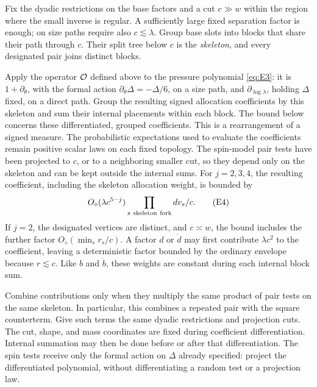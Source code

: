 \begin{proposition}\label{exp:prop-low-coefficients}
Fix the dyadic restrictions on the base factors and a cut \(c\gg w\)
within the region where the small inverse is regular. A sufficiently
large fixed separation factor is enough; on size paths require also
\(c\lesssim\lambda\). Group base slots into blocks that share their
path through \(c\). Their split tree below \(c\) is the \emph{skeleton},
and every designated pair joins distinct blocks.

Apply the operator \({\cal O}\) defined above to the pressure
polynomial \eqref{eq:E3}: it is \(1+\partial_\theta\), with the
formal action \(\partial_\theta\Delta=-\Delta/6\), on a size path,
and \(\partial_{\log\lambda}\), holding \(\Delta\) fixed, on a
direct path. Group the resulting signed allocation coefficients by
this skeleton and sum their internal placements within each block.
The bound below concerns these differentiated, grouped coefficients.
This is a rearrangement of a signed measure. The probabilistic
expectations used to evaluate
the coefficients remain positive scalar laws on each fixed topology.
The spin-model pair tests have been projected to \(c\), or to a
neighboring smaller cut, so they depend only on the skeleton and can
be kept outside the internal sums. For \(j=2,3,4\), the resulting
coefficient, including the skeleton allocation weight, is bounded by
\[
 O_\diamond(\lambda c^{5-j})\prod_{s\ {\rm skeleton\ fork}} dv_s/c .       \tag{E4}\label{eq:E4}
\]
If \(j=2\), the designated vertices are distinct, and \(c\asymp w\),
the bound includes the further factor
\(O_\diamond(\min_s r_s/c)\). A factor \(d\) or \(\dot d\) may first
contribute \(\lambda c^2\) to the coefficient, leaving a deterministic
factor bounded by the ordinary envelope because \(r\lesssim c\).
Like \(b\) and \(\dot b\), these weights are constant during each
internal block sum.

Combine contributions only when they multiply the same product of
pair tests on the same skeleton. In particular, this combines a
repeated pair with the square counterterm. Give such terms the same
dyadic restrictions and projection cuts. The cut, shape, and mass
coordinates are fixed during coefficient differentiation. Internal
summation may then be done before or after that differentiation.
The spin tests receive only the formal action on \(\Delta\) already
specified: project the differentiated polynomial, without
differentiating a random test or a projection law.
\end{proposition}

